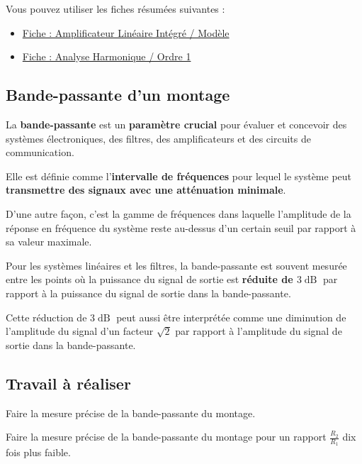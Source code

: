 Vous pouvez utiliser les fiches résumées suivantes : 

\begin{itemize}
	\item \hyperref[fiche:ALIModele]{Fiche : Amplificateur Linéaire Intégré / Modèle}
	\item \hyperref[fiche:AnHaOrdre1]{Fiche : Analyse Harmonique / Ordre 1}
\end{itemize}

\subsection{Bande-passante d'un montage}

La \textbf{bande-passante} est un \textbf{paramètre crucial} pour évaluer et concevoir des systèmes électroniques, des filtres, des amplificateurs et des circuits de communication.

Elle est définie comme l'\textbf{intervalle de fréquences} pour lequel le système peut \textbf{transmettre des signaux avec une atténuation minimale}.

D'une autre façon, c'est la gamme de fréquences dans laquelle l'amplitude de la réponse en fréquence du système reste au-dessus d'un certain seuil par rapport à sa valeur maximale.

\medskip

Pour les systèmes linéaires et les filtres, la bande-passante est souvent mesurée entre les points où la puissance du signal de sortie est \textbf{réduite de $3\operatorname{dB}$} par rapport à la puissance du signal de sortie dans la bande-passante.

\medskip

Cette réduction de $3\operatorname{dB}$ peut aussi être interprétée comme une diminution de l'amplitude du signal d'un facteur $\sqrt{2}$ par rapport à l'amplitude du signal de sortie dans la bande-passante.

\subsection{Travail à réaliser}

\Manip Faire la mesure précise de la bande-passante du montage.

\Manip Faire la mesure précise de la bande-passante du montage pour un rapport $\frac{R_2}{R_1}$ dix fois plus faible.

